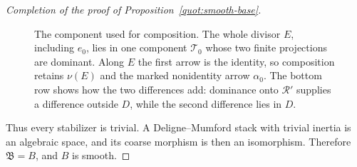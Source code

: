 \begin{proof}[Completion of the proof of Proposition~\ref{quot:smooth-base}]
\begin{figure}[tbp]
\caption{The component used for composition.  The whole divisor
\(E\), including \(e_0\), lies in one component \(\mathcal T_0\) whose
two finite projections are dominant.  Along \(E\) the first arrow is
the identity, so composition retains \(\nu(E)\) and the marked
nonidentity arrow \(\alpha_0\).  The bottom row shows how the two
differences add: dominance onto \(\mathcal R'\) supplies a difference
outside \(D\), while the second difference lies in \(D\).}
\label{quot:incidence}
\end{figure}

Thus every stabilizer is trivial.  A Deligne--Mumford stack
with trivial inertia is an algebraic space, and its coarse morphism
is then an isomorphism.  Therefore \(\mathfrak B=B\), and \(B\) is smooth.
\end{proof}
